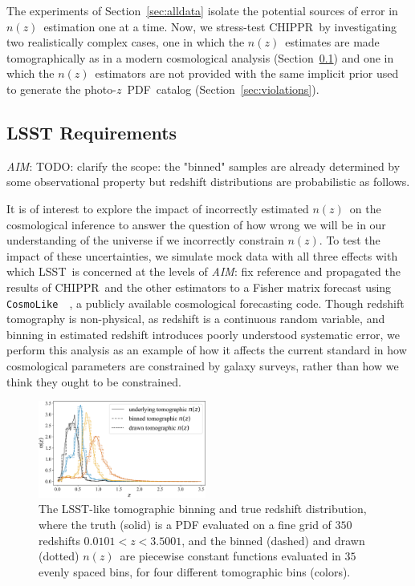 \documentclass[iop]{emulateapj}
\newcommand{\todo}[3]{{\color{#2}\emph{#1}: #3}}
\newcommand{\aim}[1]{\todo{AIM}{red}{#1}}
\newcommand{\Sect}[1]{Section~\ref{#1}}
\newcommand{\project}[1]{{\textsc{#1}}}
\newcommand{\lsst}{\project{LSST}}
\newcommand{\Chippr}{\project{CHIPPR}}
\newcommand{\repo}[1]{{\texttt{#1}}~}
\newcommand{\cosmolike}{\repo{CosmoLike}}
\newcommand{\nz}{$n(z)$}
\newcommand{\pz}{photo-$z$~}
\newcommand{\pzpdf}{\pz PDF}
\begin{document}
The experiments of \Sect{sec:alldata} isolate the potential sources of error in \nz\ estimation one at a time.
Now, we stress-test \Chippr\ by investigating two realistically complex cases, one in which the \nz\ estimates are made tomographically as in a modern cosmological analysis (\Sect{sec:lsstdemo}) and one in which the \nz\ estimators are not provided with the same implicit prior used to generate the \pzpdf\ catalog (\Sect{sec:violations}).

\subsection{LSST Requirements}
\label{sec:lsstdemo}

\aim{TODO: clarify the scope: the "binned" samples are already determined by some observational property but redshift distributions are probabilistic as follows.}

It is of interest to explore the impact of incorrectly estimated \nz\ on the cosmological inference to answer the question of how wrong we will be in our understanding of the universe if we incorrectly constrain \nz.
To test the impact of these uncertainties, we simulate mock data with all three effects with which \lsst\ is concerned at the levels of \aim{fix reference}
and propagated the results of \Chippr\ and the other estimators to a Fisher matrix forecast using \cosmolike\ \citep{krause_cosmolike_2017}, a publicly available cosmological forecasting code.
Though redshift tomography is non-physical, as redshift is a continuous random variable, and binning in estimated redshift introduces poorly understood systematic error, we perform this analysis as an example of how it affects the current standard in how cosmological parameters are constrained by galaxy surveys, rather than how we think they ought to be constrained.

\begin{figure}
	\begin{center}
		\includegraphics[width=0.49\textwidth]{figures/chippr/cosmolike_inputs.png}
		\caption{
			The \lsst-like tomographic binning and true redshift distribution, where the truth (solid) is a PDF evaluated on a fine grid of $350$ redshifts $0.0101 < z < 3.5001$, and the binned (dashed) and drawn (dotted) \nz\ are piecewise constant functions evaluated in $35$ evenly spaced bins, for four different tomographic bins (colors).
		}
		\label{fig:tomobins}
	\end{center}
\end{figure}
\end{document}
